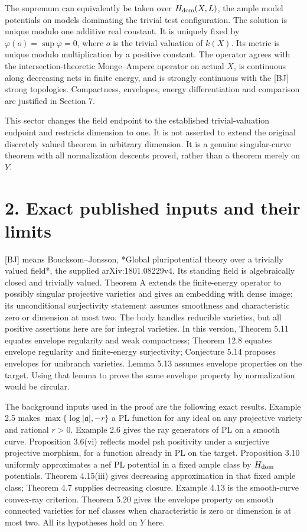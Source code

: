 \documentclass[11pt]{article}
\begin{document}
The supremum can equivalently be taken over $H_{\rm dom}(X,L)$, the ample model potentials on models dominating the trivial test configuration. The solution is unique modulo one additive real constant. It is uniquely fixed by $\varphi(o)=\sup\varphi=0$, where $o$ is the trivial valuation of $k(X)$. Its metric is unique modulo multiplication by a positive constant. The operator agrees with the intersection-theoretic Monge--Ampere operator on actual $X$, is continuous along decreasing nets in finite energy, and is strongly continuous with the [BJ] strong topologies. Compactness, envelopes, energy differentiation and comparison are justified in Section 7.

This sector changes the field endpoint to the established trivial-valuation endpoint and restricts dimension to one. It is not asserted to extend the original discretely valued theorem in arbitrary dimension. It is a genuine singular-curve theorem with all normalization descents proved, rather than a theorem merely on $Y$.

\section*{2. Exact published inputs and their limits}
[BJ] means Boucksom--Jonsson, *Global pluripotential theory over a trivially valued field*, the supplied arXiv:1801.08229v4. Its standing field is algebraically closed and trivially valued. Theorem A extends the finite-energy operator to possibly singular projective varieties and gives an embedding with dense image; its unconditional surjectivity statement assumes smoothness and characteristic zero or dimension at most two. The body handles reducible varieties, but all positive assertions here are for integral varieties. In this version, Theorem 5.11 equates envelope regularity and weak compactness; Theorem 12.8 equates envelope regularity and finite-energy surjectivity; Conjecture 5.14 proposes envelopes for unibranch varieties. Lemma 5.13 assumes envelope properties on the target. Using that lemma to prove the same envelope property by normalization would be circular.

The background inputs used in the proof are the following exact results. Example 2.5 makes $\max\{\log|\mathfrak a|,-r\}$ a PL function for any ideal on any projective variety and rational $r>0$. Example 2.6 gives the ray generators of PL on a smooth curve. Proposition 3.6(vi) reflects model psh positivity under a surjective projective morphism, for a function already in PL on the target. Proposition 3.10 uniformly approximates a nef PL potential in a fixed ample class by $H_{\rm dom}$ potentials. Theorem 4.15(iii) gives decreasing approximation in that fixed ample class; Theorem 4.7 supplies decreasing closure. Example 4.13 is the smooth-curve convex-ray criterion. Theorem 5.20 gives the envelope property on smooth connected varieties for nef classes when characteristic is zero or dimension is at most two. All its hypotheses hold on $Y$ here.
\end{document}
